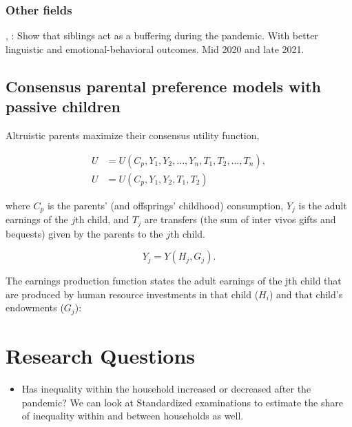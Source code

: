\documentclass[11pt,a4paper,twoside]{article}
\begin{document}
\subsubsection{Other fields}

\cite{hughes_siblings_2023}, \cite{lampis_long-lasting_2023}: Show that siblings act as a buffering during the pandemic. With better linguistic and emotional-behavioral outcomes. Mid 2020 and late 2021. 

\cite{}



\subsection{Consensus parental preference models with passive children}

Altruistic parents maximize their consensus utility function,

\begin{equation}
\begin{aligned}
U &= U(C_p, Y_1, Y_2, \ldots, Y_n, T_1, T_2, \ldots, T_n), \\
U &= U(C_p, Y_1, Y_2, T_1, T_2)
\end{aligned}
\tag{1}
\end{equation}

where $C_p$ is the parents' (and offsprings' childhood) consumption, $Y_j$ is the adult earnings of the $j$th child, and $T_j$ are transfers (the sum of inter vivos gifts and bequests) given by the parents to the $j$th child. 

\begin{equation}
Y_j = Y(H_j, G_j).
\tag{2}
\end{equation}

The earnings production function states the adult earnings of the jth child that are produced by human resource investments in that child ($H_i$) and that child's endowments ($G_j$):

\section{Research Questions}

\begin{itemize}
    \item Has inequality within the household increased or decreased after the pandemic? We can look at Standardized examinations to estimate the share of inequality within and between households as well. \cite{giannola_parental_2024}
\end{itemize}






\end{document}

